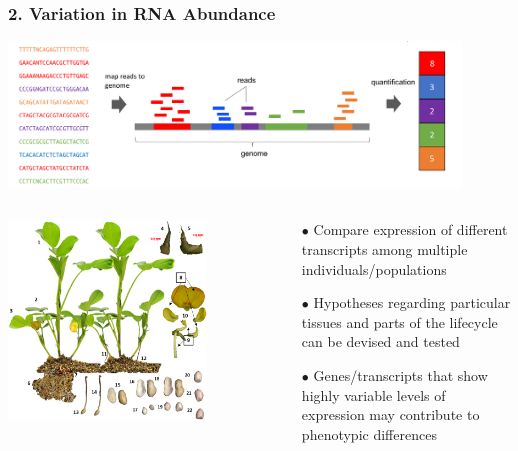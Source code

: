 \documentclass{beamer}
\begin{document}
	\begin{frame}
		\frametitle{2. Variation in RNA Abundance}
\centering	\includegraphics[keepaspectratio, width  = 0.9\textwidth]{img/rnaSeqSection}
\begin{columns}
	\begin{column}{0.5\textwidth}
					\centering	\includegraphics[keepaspectratio, width  = 0.8\textwidth]{img/peanut}	
					
					\end{column}
	\begin{column}{0.5\textwidth}
\scriptsize
	\begin{itemize}
		\item[$\bullet$] Compare expression of different transcripts among multiple individuals/populations
		\item[$\bullet$] Hypotheses regarding particular tissues and parts of the lifecycle can be devised and tested
		\item[$\bullet$] Genes/transcripts that show highly variable levels of expression may contribute to phenotypic differences
		
		\end{itemize}

	\end{column}
\end{columns}

\end{frame}
\end{document}
